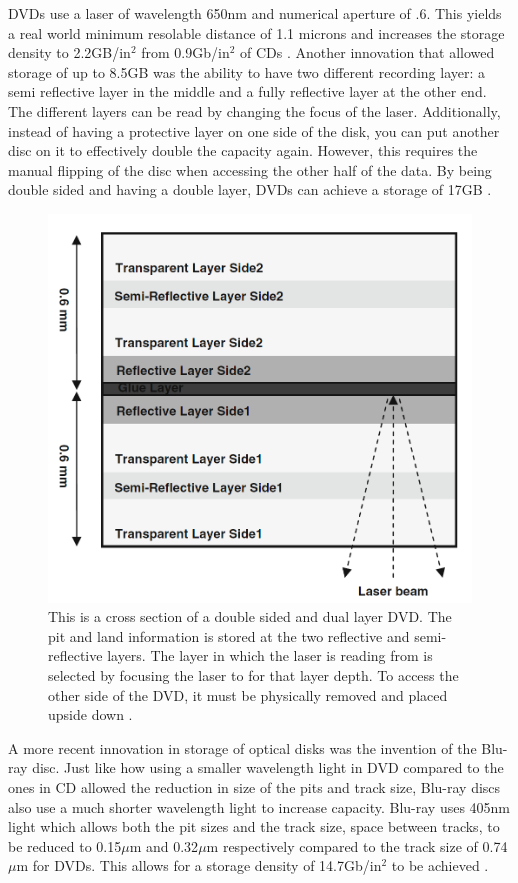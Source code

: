 \documentclass[ notitlepage, numerical, 11pt]{revtex4-1} %
\begin{document}
DVDs use a laser of wavelength 650nm and numerical aperture of .6. This yields a real world minimum resolable distance of 1.1 microns and increases the storage density to 2.2GB/in$^2$ from 0.9Gb/in$^2$ of CDs \cite{memory}. Another innovation that allowed storage of up to 8.5GB was the ability to have two different recording layer: a semi reflective layer in the middle and a fully reflective layer at the other end. The different layers can be read by changing the focus of the laser. Additionally, instead of having a protective layer on one side of the disk, you can put another disc on it to effectively double the capacity again. However, this requires the manual flipping of the disc when accessing the other half of the data. By being double sided and having a double layer, DVDs can achieve a storage of 17GB \cite{memory}.

\begin{figure}[H]
\centerline{\includegraphics[scale=.45]{DVD.png}}
\caption{This is a cross section of a double sided and dual layer DVD. The pit and land information is stored at the two reflective and semi-reflective layers. The layer in which the laser is reading from is selected by focusing the laser to for that layer depth. To access the other side of the DVD, it must be physically removed and placed upside down \cite{memory}.}
\label{DVD}
\end{figure} 

A more recent innovation in storage of optical disks was the invention of the Blu-ray disc. Just like how using a smaller wavelength light in DVD compared to the ones in CD allowed the reduction in size of the pits and track size, Blu-ray discs also use a much shorter wavelength light to increase capacity. Blu-ray uses 405nm light which allows both the pit sizes and the track size, space between tracks, to be reduced to 0.15$\mu$m and 0.32$\mu$m respectively compared to the track size of 0.74$\mu$m for DVDs. This allows for a storage density of 14.7Gb/in$^2$ to be achieved \cite{memory}. 
\end{document}
